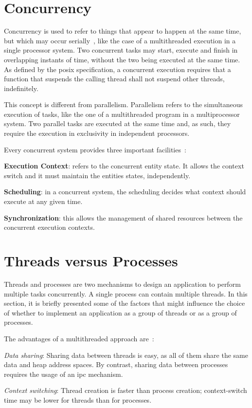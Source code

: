 %
\section{Concurrency}%
\label{sec:concurrency}
Concurrency is used to refer to things that appear to happen at the same time,
but which may occur serially~\cite{buttlar1996pthreads}, like the case of a
multithreaded execution in a single processor system.
Two concurrent tasks may start, execute and finish in overlapping instants of
time, without the two being executed at the same time.
As defined by the \gls{posix} specification, a concurrent execution requires that a function that
suspends the calling thread shall not suspend other threads, indefinitely.

This concept is different from parallelism. Parallelism refers to the
simultaneous execution of tasks, like the one of a multithreaded program in a
multiprocessor system.
Two parallel tasks are executed at the same time and, as such, they require
the execution in exclusivity in independent processors.

Every concurrent system provides three important facilities~\cite{buttlar1996pthreads}:
\begin{item-c}
\item \textbf{Execution Context}: refers to the concurrent entity state. It
  allows the context switch and it must maintain the entities states,
  independently.
\item \textbf{Scheduling}: in a concurrent system, the scheduling decides what
  context should execute at any given time.
\item \textbf{Synchronization}: this allows the management of shared resources
  between the concurrent execution contexts.
\end{item-c}

\section{Threads versus Processes}
\label{sec:threads-vs-processes}
Threads and processes are two mechanisms to design an application to perform
multiple tasks concurrently. A single process can contain multiple threads.
In this section, it is briefly presented some of the factors that might
influence the choice of whether to implement an application as a group of
threads or as a group of processes.

The advantages of a multithreaded approach are~\cite{kerrisk2010linux}:
\begin{item-c}
\item \emph{Data sharing}: Sharing data between threads is easy, as all of them
  share the same data and heap address spaces. By contrast, sharing data between
  processes requires the usage of an \gls{ipc} mechanism.
\item \emph{Context switching}: Thread creation is faster than process creation;
  context-switch time may be lower for threads than for processes.
\end{item-c}


